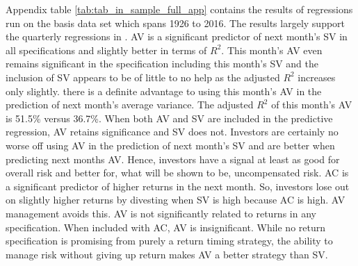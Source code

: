 Appendix table \ref{tab:tab_in_sample_full_app} contains the results of regressions run on the basis data set which spans 1926 to 2016. The results largely support the quarterly regressions in \citet{pollet_average_2010}. AV is a significant predictor of next month’s SV in all specifications and slightly better in terms of $R^{2}$. This month’s AV even remains significant in the specification including this month’s SV and the inclusion of SV appears to be of little to no help as the adjusted $R^{2}$ increases only slightly. there is a definite advantage to using this month’s AV in the prediction of next month’s average variance. The adjusted $R^{2}$ of this month's AV is 51.5\% versus 36.7\%. When both AV and SV are included in the predictive regression, AV retains significance and SV does not. Investors are certainly no worse off using AV in the prediction of next month's SV and are better when predicting next months AV. Hence, investors have a signal at least as good for overall risk and better for, what will be shown to be, uncompensated risk. AC is a significant predictor of higher returns in the next month. So, investors lose out on slightly higher returns by divesting when SV is high because AC is high. AV management avoids this. AV is not significantly related to returns in any specification. When included with AC, AV is insignificant. While no return specification is promising from purely a return timing strategy, the ability to manage risk without giving up return makes AV a better strategy than SV.
